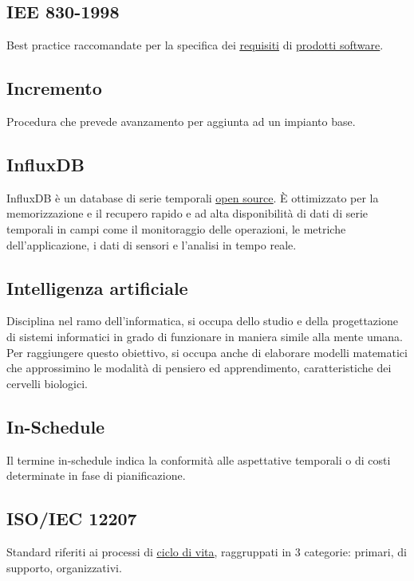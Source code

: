 	\newpage


	\subsection{IEE 830-1998}
	\label{sec:iee830}
	Best practice raccomandate per la specifica dei \underline{\hyperref[sec:requisito]{requisiti}} di \underline{\hyperref[sec:prodottosoftware]{prodotti software}}.


	\subsection{Incremento}
	\label{sec:incremento}
	Procedura che prevede avanzamento per aggiunta ad un impianto base.


	\subsection{InfluxDB}
	\label{sec:influxdb}
	InfluxDB è un database di serie temporali \underline{\hyperref[sec:opensource]{open source}}. È ottimizzato per la memorizzazione e il recupero rapido e ad alta disponibilità di dati di serie temporali in campi come il monitoraggio delle operazioni, le metriche dell'applicazione, i dati di sensori e l'analisi in tempo reale.


	\subsection{Intelligenza artificiale}
	\label{sec:ia}
	Disciplina nel ramo dell'informatica, si occupa dello studio e della progettazione di sistemi informatici in grado di funzionare in maniera simile alla mente umana. Per raggiungere questo obiettivo, si occupa anche di elaborare modelli matematici che approssimino le modalità di pensiero ed apprendimento, caratteristiche dei cervelli biologici.


	\subsection{In-Schedule}
	\label{sec:inschedule}
	Il termine in-schedule indica la conformità alle aspettative temporali o di costi determinate in fase di pianificazione.


	\subsection{ISO/IEC 12207}
	\label{sec:iso12207}
	Standard riferiti ai processi di \underline{\hyperref[sec:ciclodivita]{ciclo di vita}}, raggruppati in 3 categorie: primari, di supporto, organizzativi.


